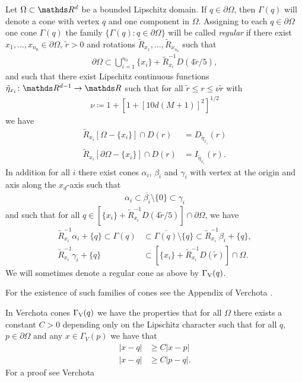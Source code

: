 \begin{defn}
  \label{defn:regularFamilyOfCones}
  Let $\Omega \subset \R^d$ be a bounded Lipschitz domain.
  If $q \in \partial\Omega$, then $\Gamma(q)$ will denote a cone with vertex $q$ and one component in $\Omega$.
  Assigning to each $q \in \partial\Omega$ one cone $\Gamma(q)$ the family $\{ \Gamma(q) \colon q \in \partial\Omega \}$ will be called \emph{regular} if there exist $x_1, \dots,x_{n_0} \in \partial\Omega$, $\tilde r > 0$ and rotations $\tilde R_{x_1}, \dots, \tilde R_{x_{n_0}}$ such that
  \begin{align*}
    \partial\Omega \subset \bigcup_{i = 1}^{n_0} \{ x_i \} + \tilde R_{x_i}^{-1} D(4 \tilde r / 5),
  \end{align*}
  and such that there exist Lipschitz continuous functions $\tilde \eta_{x_i} \colon \R^{d - 1} \to \R$ such that for all $\tilde r \leq r \leq \nu \tilde r$ with 
  \begin{align*}
    \nu \coloneqq 1 + [ 1 + [10 d(M + 1)]^2]^{1/2}
  \end{align*}
  we have
  \begin{align*}
    \tilde R_{x_i}[\Omega - \{x_i\}] \cap D(r) &= D_{\tilde \eta_{x_i}}(r) \\
    \tilde R_{x_i}[\partial\Omega - \{x_i\}] \cap D(r) &= I_{\tilde \eta_{x_i}}(r).
  \end{align*}
  In addition for all $i$ there exist cones $\alpha_i$, $\beta_i$ and $\gamma_i$ with vertex at the origin and axis along the $x_d$-axis such that
  \begin{align*}
    \alpha_i \subset \overline{\beta_i} \setminus\{0\} \subset \gamma_i
  \end{align*}
  and such that for all $q \in [ \{ x_i\} + \tilde R_{x_i}^{-1} D(4 \tilde r / 5)] \cap \partial\Omega$, we have
  \begin{align*}
    \tilde R_{x_i}^{-1} \alpha_i + \{ q\} \subset \Gamma(q) &\subset \overline{\Gamma(q)} \setminus \{q\} \subset \tilde R_{x_i}^{-1} \beta_i + \{ q\}, \\
    \tilde R_{x_i}^{-1} \gamma_i + \{q\} &\subset [\{ x_i\} + \tilde R_{x_i}^{-1} D(\tilde r)] \cap \Omega.
  \end{align*}
  We will sometimes denote a regular cone as above by $\Gamma_\mathrm{V}(q)$.
\end{defn}

For the existence of such families of cones see the Appendix of Verchota \cite{verchota}.

In Verchota cones $\Gamma_\mathrm{V}(q)$ we have the properties that for all $\Omega$ there exists a constant $C > 0$ depending only on the Lipschitz character such that for all $q$, $p \in \partial\Omega$ and any $x \in \Gamma_V(p)$ we have that
\begin{align}
  |x - q| &\geq C |x - p| \label{eq:verCone1}\\ 
  |x - q| &\geq C |p - q|.\label{eq:verCone2}
\end{align}
For a proof see Verchota \cite[p. 9f.]{verchota}

